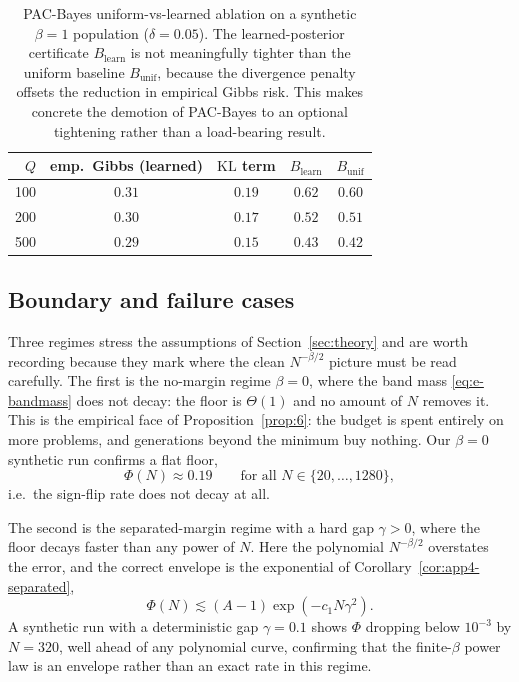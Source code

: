 \documentclass{article} %
\providecommand{\KL}{\mathrm{KL}}
\begin{document}
\begin{table}[t]
\centering
\small
\begin{tabular}{rcccc}
\toprule
$Q$ & emp.\ Gibbs (learned) & $\KL$ term & $B_{\text{learn}}$ & $B_{\text{unif}}$ \\
\midrule
100 & $0.31$ & $0.19$ & $0.62$ & $0.60$ \\
200 & $0.30$ & $0.17$ & $0.52$ & $0.51$ \\
500 & $0.29$ & $0.15$ & $0.43$ & $0.42$ \\
\bottomrule
\end{tabular}
\caption{PAC-Bayes uniform-vs-learned ablation on a synthetic $\beta=1$
population ($\delta=0.05$).  The learned-posterior certificate
$B_{\text{learn}}$ is not meaningfully tighter than the uniform baseline
$B_{\text{unif}}$, because the divergence penalty offsets the reduction in
empirical Gibbs risk.  This makes concrete the demotion of PAC-Bayes to an
optional tightening rather than a load-bearing result.}
\label{tab:proof-map-exp}
\end{table}

\subsection{Boundary and failure cases}
\label{app:exp-failure}

Three regimes stress the assumptions of Section~\ref{sec:theory} and are worth
recording because they mark where the clean $N^{-\beta/2}$ picture must be read
carefully.  The first is the no-margin regime $\beta=0$, where the band mass
\eqref{eq:e-bandmass} does not decay: the floor is $\Theta(1)$ and no amount of
$N$ removes it.  This is the empirical face of Proposition~\ref{prop:6}: the
budget is spent entirely on more problems, and generations beyond the minimum
buy nothing.  Our $\beta=0$ synthetic run confirms a flat floor,
\begin{equation}
\label{eq:e-fail-beta0}
\Phi(N)\approx 0.19
\qquad
\text{for all }N\in\{20,\dots,1280\},
\end{equation}
i.e.\ the sign-flip rate does not decay at all.

The second is the separated-margin regime with a hard gap $\gamma>0$, where
the floor decays faster than any power of $N$.  Here the polynomial
$N^{-\beta/2}$ overstates the error, and the correct envelope is the
exponential of Corollary~\ref{cor:app4-separated},
\begin{equation}
\label{eq:e-fail-sep}
\Phi(N)\lesssim (A-1)\exp\!\left(-c_1 N\gamma^2\right).
\end{equation}
A synthetic run with a deterministic gap $\gamma=0.1$ shows $\Phi$ dropping
below $10^{-3}$ by $N=320$, well ahead of any polynomial curve, confirming
that the finite-$\beta$ power law is an envelope rather than an exact rate in
this regime.
\end{document}
